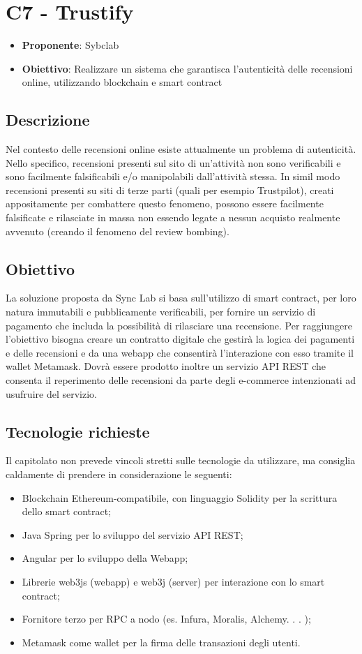 \section*{C7 - Trustify}
\begin{itemize}
    \item \textbf{Proponente}: Sybclab
    \item \textbf{Obiettivo}: Realizzare un sistema che garantisca l’autenticità delle recensioni online, utilizzando blockchain e smart contract
\end{itemize}

\subsection*{Descrizione}
Nel contesto delle recensioni online esiste attualmente un problema di autenticità. Nello
specifico, recensioni presenti sul sito di un’attività non sono verificabili e sono facilmente
falsificabili e/o manipolabili dall’attività stessa. In simil modo recensioni presenti su siti
di terze parti (quali per esempio Trustpilot), creati appositamente per combattere questo
fenomeno, possono essere facilmente falsificate e rilasciate in massa non essendo legate a
nessun acquisto realmente avvenuto (creando il fenomeno del review bombing).

\subsection*{Obiettivo}
La soluzione proposta da Sync Lab si basa sull’utilizzo di smart contract, per loro natura
immutabili e pubblicamente verificabili, per fornire un servizio di pagamento che includa
la possibilità di rilasciare una recensione.
Per raggiungere l’obiettivo bisogna creare un contratto digitale che gestirà la logica dei
pagamenti e delle recensioni e da una webapp che consentirà l’interazione con esso tramite
il wallet Metamask. Dovrà essere prodotto inoltre un servizio API REST che consenta
il reperimento delle recensioni da parte degli e-commerce intenzionati ad usufruire del
servizio.

\subsection*{Tecnologie richieste}
Il capitolato non prevede vincoli stretti sulle tecnologie da utilizzare, ma consiglia caldamente di prendere in considerazione le seguenti:
\begin{itemize}
    \item Blockchain Ethereum-compatibile, con linguaggio Solidity per la scrittura dello smart contract;
    \item Java Spring per lo sviluppo del servizio API REST;
    \item Angular per lo sviluppo della Webapp;
    \item Librerie web3js (webapp) e web3j (server) per interazione con lo smart contract;
    \item Fornitore terzo per RPC a nodo (es. Infura, Moralis, Alchemy. . . );
    \item Metamask come wallet per la firma delle transazioni degli utenti.
\end{itemize}

